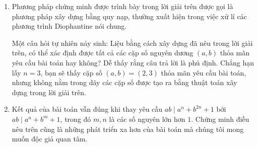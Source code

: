 \begin{bt}
{\begin{nx}
\begin{enumerate}[\bf 1.]
		\item Phương pháp chứng minh được trình bày trong lời giải trên được gọi là phương pháp xây dựng bằng quy nạp, thường xuất hiện trong việc xử lí các phương trình Diophantine nói chung.
		
		Một câu hỏi tự nhiên nảy sinh: Liệu bằng cách xây dựng đã nêu trong lời giải trên, có thể xác định được tất cả các cặp số nguyên dương $(a,b)$ thỏa mãn yêu cầu bài toán hay không? Dễ thấy rằng câu trả lời là phủ định. Chẳng hạn lấy $n=3$, bạn sẽ thấy cặp số $(a,b)= (2,3)$ thỏa mãn yêu cầu bài toán, nhưng không nằm trong dãy các cặp số được tạo ra bằng thuật toán xây dựng trong lời giải trên.
		
		\item Kết quả của bài toán vẫn đúng khi thay yêu cầu $	ab \mid  a^n +b^{2n} +1$ bởi $	ab \mid  a^n +b^{m} +1$, trong đó $m,n$ là các số nguyên lớn hơn $1$. Chứng minh điều nêu trên cũng là những phát triển xa hơn của bài toán mà chúng tôi mong muốn độc giả quan tâm.
	\end{enumerate}
\end{nx}
}
\end{bt}
